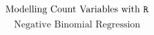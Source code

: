 \documentclass{beamer}
\begin{document}
\begin{frame}
	
	\huge
	\[ \mbox{Modelling Count Variables with \texttt{R} } \]
		\Large
		\[ \mbox{Negative Binomial Regression } \]
	\end{frame}



\end{document}
